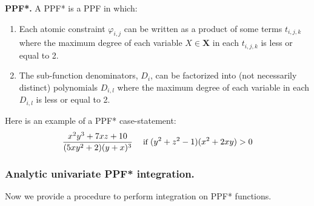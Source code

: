 \documentclass[]{article}
\renewcommand{\vec}[1]{\mathbf{#1}}
\newcommand{\bvec}[1]{\textbf{#1}}
\newcommand{\singlecase}[2]{#2 \quad \text{ if } #1}
\begin{document}
\textbf{PPF*. }
A PPF* is a PPF in which: %
\vspace{-2mm}
\begin{enumerate}[leftmargin=2.6ex]
\item Each atomic constraint $\varphi_{i,j}$
can be written as a product of some terms $t_{i,j,k}$ where the maximum degree of each variable $X \in \bvec{X}$ in each $t_{i,j,k}$ is less or equal to 2. %
\item The sub-function denominators, $D_{i}$, can be factorized into (not necessarily distinct) polynomials ${D}_{i,l}$ where the maximum degree of each variable in each $D_{i,l}$ is less or equal to 2.
\end{enumerate}
\vspace{-2mm}
Here is an example of a PPF* case-statement:
\begin{equation}\vspace{-0.5mm}
{\footnotesize
\label{e:ppf*example}
\singlecase{(y^2+z^2 -1)(x^2+2xy) > 0}
{\frac{x^2 y^3 + 7xz + 10}{(5xy^2 + 2)(y + x)^3}}
}
\end{equation}



\subsubsection*{Analytic univariate PPF* integration.} 
Now we provide a procedure to perform integration on PPF* functions.
\end{document}
